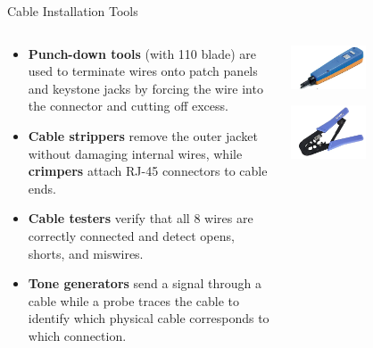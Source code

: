 \documentclass[aspectratio=169]{beamer}
\begin{document}
\begin{frame}{Cable Installation Tools}
    \begin{columns}[T]
        \begin{column}{0.55\textwidth}
            \begin{itemize}
                \item \textbf{Punch-down tools} (with 110 blade) are used to terminate wires onto patch panels and keystone jacks by forcing the wire into the connector and cutting off excess.
                \item \textbf{Cable strippers} remove the outer jacket without damaging internal wires, while \textbf{crimpers} attach RJ-45 connectors to cable ends.
                \item \textbf{Cable testers} verify that all 8 wires are correctly connected and detect opens, shorts, and miswires.
                \item \textbf{Tone generators} send a signal through a cable while a probe traces the cable to identify which physical cable corresponds to which connection.
            \end{itemize}
        \end{column}
        \begin{column}{0.4\textwidth}
            \centering
            \includegraphics[width=0.45\textwidth]{punch_down.png}
            
            \vspace{0.2cm}
            \includegraphics[width=0.45\textwidth]{cable_crimper.png}
            

\end{column}
\end{columns}
\end{frame}
\end{document}
